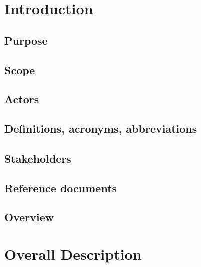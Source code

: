 \documentclass{article}
\title{
	\Huge{\textbf{\centerline{myTaxiService}}}
	\newline
	\huge{\textbf{R}equirement \textbf{A}nalysis and \textbf{S}pecification \textbf{D}ocument}
}
\author{
	Monica Magoni 854091
	\\
	Alberto Cibari 852689
}
\date{\today}
\begin{document}
	\maketitle
	\newpage
	\renewcommand*\contentsname{\Huge{Contents}}
	\tableofcontents
	
	\newpage
	
\section{Introduction}
	
	\subsection{Purpose}
	
	
	\subsection{Scope}
	
	
	\subsection{Actors}
	
	
	\subsection{Definitions, acronyms, abbreviations}
	
	
	\subsection{Stakeholders}
	
	
	\subsection{Reference documents}
	

	\subsection{Overview}
	
	
	
\newpage
\section{Overall Description}
\end{document}
